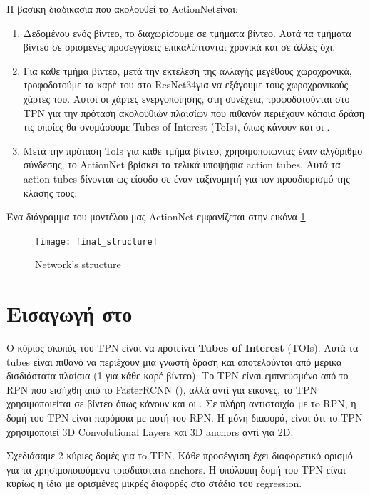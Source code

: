 Η βασική διαδικασία που ακολουθεί το \en ActionNet\gr είναι:
\begin{enumerate}
\item Δεδομένου ενός βίντεο, το διαχωρίσουμε σε τμήματα βίντεο. Αυτά τα τμήματα βίντεο  σε ορισμένες προσεγγίσεις επικαλύπτονται χρονικά και σε άλλες όχι.
\item Για κάθε τμήμα βίντεο, μετά την εκτέλεση της αλλαγής μεγέθους χωροχρονικά, τροφοδοτούμε τα καρέ του στο \en ResNet34\gr για να εξάγουμε τους χωροχρονικούς
  χάρτες του. Αυτοί οι χάρτες ενεργοποίησης, στη συνέχεια, τροφοδοτούνται στο \en TPN \gr για την πρόταση ακολουθιών πλαισίων που πιθανόν περιέχουν κάποια δράση τις οποίες 
  θα  ονομάσουμε \en Tubes of Interest (ToIs)\gr, όπως κάνουν και οι \en \cite{DBLP:journals/corr/HouCS17}\gr .
\item Μετά την πρόταση \en ToIs \gr για κάθε τμήμα βίντεο, χρησιμοποιώντας έναν αλγόριθμο σύνδεσης, το \en ActionNet \gr βρίσκει τα τελικά υποψήφια \en action tubes\gr.
 Αυτά τα \en action tubes \gr δίνονται ως είσοδο σε έναν ταξινομητή για τον προσδιορισμό της κλάσης τους.
\end{enumerate}

Ένα διάγραμμα του μοντέλου μας \en ActionNet \gr εμφανίζεται στην εικόνα \ref{fig:gr_whole_network_}. 

\begin{figure}[h]
  \centering
  \texttt{[image: final\_structure]}
  \caption{\en Network's structure}
  \label{fig:gr_whole_network_}
\end{figure}
\gr
\section{\gr Εισαγωγή στο }
Ο κύριος σκοπός του  \en TPN  \gr  είναι να προτείνει \en\textbf{Tubes of Interest} (TOIs)\gr. Αυτά τα \en  tubes \gr  είναι πιθανό να περιέχουν μια γνωστή δράση και αποτελούνται από μερικά
δισδιάστατα πλαίσια (1 για κάθε καρέ βίντεο). Το \en  TPN \gr  είναι εμπνευσμένο από το \en  RPN \gr  που εισήχθη από το \en   FasterRCNN (\cite{Ren:2015:FRT:2969239.2969250})\gr ,
αλλά αντί για εικόνες, το \en  TPN \gr  χρησιμοποιείται σε βίντεο όπως κάνουν και οι \en \cite{DBLP:journals/corr/HouCS17}\gr . Σε πλήρη αντιστοιχία με τo \en  RPN\gr , η δομή
του \en  TPN \gr  είναι παρόμοια με αυτή  του \en  RPN\gr . Η μόνη διαφορά, είναι ότι το  \en TPN \gr  χρησιμοποιεί \en  3D Convolutional Layers  \gr και \en  3D anchors \gr  αντί  για \en  2D\gr.  \par
Σχεδιάσαμε 2 κύριες δομές για τo \en  TPN\gr. Κάθε προσέγγιση έχει διαφορετικό ορισμό για τα χρησιμοποιούμενα τρισδιάστατa \en  anchors\gr. 
Η υπόλοιπη δομή του \en  TPN \gr  είναι κυρίως η ίδια με ορισμένες μικρές διαφορές στο στάδιο του  \en  regression. \gr  \par

